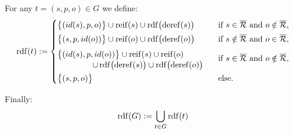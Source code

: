 \noindent
For any {\RDFplusTriple} $t = (s,p,o) \in G$ we define:
\begin{equation*}
	\fctDescent{t} := \begin{cases}
\vspace{1mm}
		\big\lbrace (id(s),p,o) \big\rbrace \cup \mathrm{reif}(s) \cup \symDescentFct\bigl(\fctDeref{s}\bigr) & \text{if $s \in \symAllTRefs$ and $o \notin \symAllTRefs$,} \\
\vspace{1mm}
		\big\lbrace (s,p,id(o)) \big\rbrace \cup \mathrm{reif}(o) \cup \symDescentFct\bigl(\fctDeref{o}\bigr) & \text{if $s \notin \symAllTRefs$ and $o \in \symAllTRefs$,} \\
\vspace{1mm}
		\begin{minipage}[c]{65mm}\vspace{1mm}
			$\big\lbrace (id(s),p,id(o)) \big\rbrace \cup \mathrm{reif}(s) \cup \mathrm{reif}(o)$ \\
			\hspace*{15mm}$\cup \, \symDescentFct\bigl(\fctDeref{s}\bigr) \cup \symDescentFct\bigl(\fctDeref{o}\bigr)$
		\end{minipage} & \text{if $s \in \symAllTRefs$ and $o \notin \symAllTRefs$,} \\
		\big\lbrace (s,p,o) \big\rbrace & \text{else} .
\end{cases}
\end{equation*}

\noindent
Finally:
\begin{equation*}
	\mathrm{rdf}(G) := \bigcup_{t \in G} \mathrm{rdf}(t)
\end{equation*}

